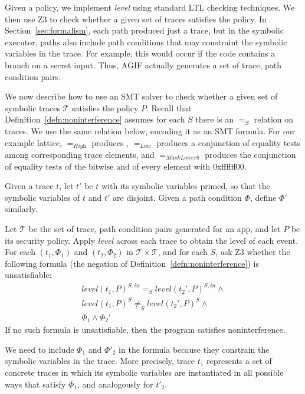 \documentclass{entcs} \usepackage{entcsmacro}
\newcommand{\code}[1]{\text{\lstinline!#1!}}
\newcommand{\toolname}{AGIF\xspace}
\newcommand{\tr}{t\xspace}
\newcommand{\tset}{\ensuremath{\mathcal{T}}\xspace}
\newcommand{\tleveltr}[2]{\textit{level}(#1, #2)}
\begin{document}
Given a policy, we implement \emph{level} using standard LTL checking
techniques. We then use Z3 to check whether a
given set of traces satisfies the policy. In
Section~\ref{sec:formalism}, each path produced just a trace, but in
the symbolic executor, paths also include path conditions that may
constraint the symbolic variables in the trace. For example, this
would occur if the code contains a branch on a secret input. Thus,
\toolname{} actually generates a set of trace, path condition
pairs. 

We now describe how to use an SMT solver to check whether a given set
of symbolic traces $\tset$ satisfies the policy $P$. Recall that
Definition~\ref{defn:noninterference} assumes for each $S$ there is an
$=_S$ relation on traces. We use the same relation below, encoding it
as an SMT formula. For our example lattice, $=_\textit{High}$ produces
\code{true}, $=_\textit{Low}$ produces a conjunction of equality tests
among corresponding trace elements, and $=_\textit{MaskLower8}$
produces the conjunction of equality tests of the bitwise and of every
element with 0xffffff00.

Given a trace
$t$, let $t'$ be $t$ with its symbolic variables primed, so that the
symbolic variables of $t$ and $t'$ are disjoint. Given a path
condition $\Phi$, define $\Phi'$ similarly.

\begin{algorithm}
  Let $\tset$ be the set of trace, path condition pairs generated for
  an app, and let $P$ be its security policy. Apply \emph{level}
  across each trace to obtain the level of each event.  For each
  $(t_1, \Phi_1)$ and $(t_2, \Phi_2)$ in $\tset\times\tset$, and for
  each $S$, ask Z3 whether the following formula (the negation of
  Definition~\ref{defn:noninterference}) is unsatisfiable:
  \begin{displaymath}
    \begin{array}{c}
      \tleveltr{\tr_1}{P}^{S,in} =_S \tleveltr{\tr_2'}{P}^{S,in} \land \\
      \tleveltr{\tr_1}{P}^S \neq_S \tleveltr{\tr_2'}{P}^S \land \\
      \Phi_1 \land \Phi_2'
    \end{array}
  \end{displaymath}
  If no such formula is unsatisfiable, then the program satisfies noninterference.
\end{algorithm}
We need to include $\Phi_1$ and $\Phi'_2$ in the formula because they
constrain the symbolic variables in the trace. More precisely, trace
$\tr_1$ represents a set of concrete traces in which its symbolic
variables are instantiated in all possible ways that satisfy $\Phi_1$,
and analogously for $\tr'_2$.
\end{document}
